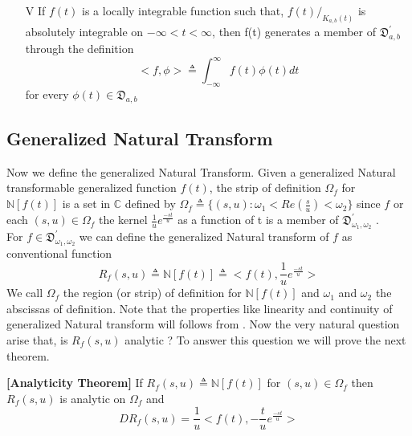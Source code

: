 \begin{itemize}
\item[V]If $f(t)$ is a locally integrable function such that, $ f(t)/_{K_{a,b}(t)} $ is absolutely
integrable on $-\infty < t < \infty $, then f(t) generates a member of $ \mathfrak{D}_{a,b}^{'} $ through the definition\cite{R98}
\begin{equation*}
<f,\phi>\triangleq \int_{-\infty}^{\infty}f(t)\phi(t)dt
\end{equation*}
for every $ \phi(t)\in \mathfrak{D}_{a,b} $
\end{itemize}
\subsection{Generalized Natural Transform}
Now we define the generalized Natural Transform. Given a generalized Natural transformable generalized function $f(t)$, the strip of definition $\Omega_{f}$ for $\mathbb{N}[f(t)]$ is a set in $\mathbb{C}$ defined by $\Omega_{f}\triangleq\lbrace(s,u):\omega_{1}<Re(\frac{s}{u})<\omega_{2}\rbrace$ since $f$ or each $(s,u)\in\Omega_{f}$ the kernel $\frac{1}{u}e^{\frac{-st}{u}}$ as a function of t is a member of $\mathfrak{D}_{\omega_{1},\omega_{2}}^{'}$ .\\
 For $f\in \mathfrak{D}_{\omega_{1},\omega_{2}}^{'}$ we can define the generalized Natural transform of $f$ as conventional function
 \begin{equation}
  R_{f}(s,u)\triangleq \mathbb{N}[f(t)]\triangleq<f(t),\frac{1}{u}e^{\frac{-st}{u}}>
 \end{equation}
 We call $\Omega_{f}$ the region (or strip) of definition for $\mathbb{N}[f(t)]$ and
$\omega_{1}$ and $\omega_{2}$ the abscissas of definition.
 Note that the properties like linearity and continuity of generalized Natural transform will follows from \cite{R98}. Now the very natural question arise that, is  $  R_{f}(s,u) $ analytic ? To answer this question we will prove the next theorem.
 \begin{theorem}
\textbf{[Analyticity Theorem]}
If $ R_{f}(s,u)\triangleq \mathbb{N}[f(t)]$ for $(s,u)\in\Omega_{f}$ then 
$ R_{f}(s,u)$ is analytic on $\Omega_{f}$ and 
\begin{equation}
DR_{f}(s,u)=\frac{1}{u}<f(t),-\frac{t}{u}e^{\frac{-st}{u}}>
\end{equation}
\end{theorem}
